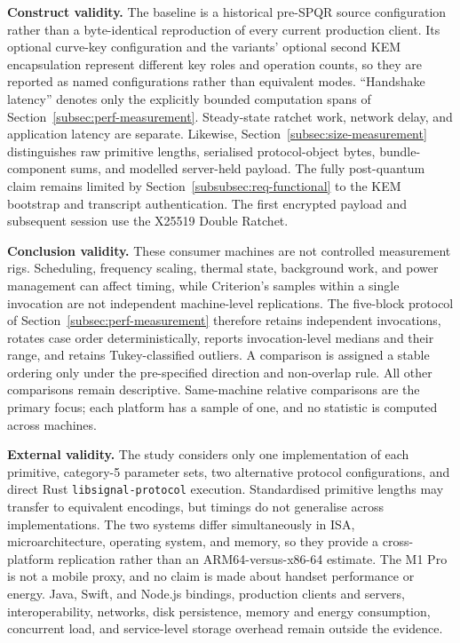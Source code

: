 \textbf{Construct validity.} The baseline is a historical pre-SPQR source configuration rather than a byte-identical reproduction of every current production client. Its optional curve-key configuration and the variants' optional second KEM encapsulation represent different key roles and operation counts, so they are reported as named configurations rather than equivalent modes. ``Handshake latency'' denotes only the explicitly bounded computation spans of Section~\ref{subsec:perf-measurement}. Steady-state ratchet work, network delay, and application latency are separate. Likewise, Section~\ref{subsec:size-measurement} distinguishes raw primitive lengths, serialised protocol-object bytes, bundle-component sums, and modelled server-held payload. The fully post-quantum claim remains limited by Section~\ref{subsubsec:req-functional} to the KEM bootstrap and transcript authentication. The first encrypted payload and subsequent session use the X25519 Double Ratchet.

\textbf{Conclusion validity.} These consumer machines are not controlled measurement rigs. Scheduling, frequency scaling, thermal state, background work, and power management can affect timing, while Criterion's samples within a single invocation are not independent machine-level replications. The five-block protocol of Section~\ref{subsec:perf-measurement} therefore retains independent invocations, rotates case order deterministically, reports invocation-level medians and their range, and retains Tukey-classified outliers. A comparison is assigned a stable ordering only under the pre-specified direction and non-overlap rule. All other comparisons remain descriptive. Same-machine relative comparisons are the primary focus; each platform has a sample of one, and no statistic is computed across machines.

\textbf{External validity.} The study considers only one implementation of each primitive, category-5 parameter sets, two alternative protocol configurations, and direct Rust \texttt{libsignal-protocol} execution. Standardised primitive lengths may transfer to equivalent encodings, but timings do not generalise across implementations. The two systems differ simultaneously in ISA, microarchitecture, operating system, and memory, so they provide a cross-platform replication rather than an ARM64-versus-x86-64 estimate. The M1 Pro is not a mobile proxy, and no claim is made about handset performance or energy. Java, Swift, and Node.js bindings, production clients and servers, interoperability, networks, disk persistence, memory and energy consumption, concurrent load, and service-level storage overhead remain outside the evidence.

